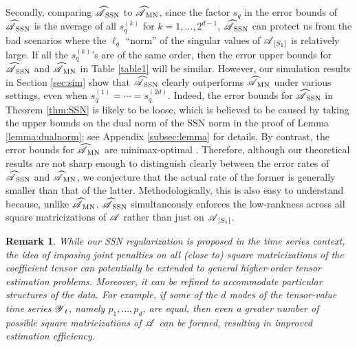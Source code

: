 \documentclass[12pt]{article}
\newtheorem{remark}{Remark}
\newcommand{\cm}[1]{\mbox{\boldmath$\mathscr{#1}$}}
\begin{document}
Secondly, comparing $\cm{\widehat{A}}_{\textup{SSN}}$ to $\cm{\widehat{A}}_{\textup{MN}}$, since the factor $s_q$ in the error bounds of $\cm{\widehat{A}}_{\textup{SSN}}$ is the average of all $s_q^{(k)}$ for $k=1,\dots, 2^{d-1}$, $\cm{\widehat{A}}_{\textup{SSN}}$ can protect us from the bad scenarios where the $\ell_q$ ``norm'' of the singular values of $\cm{A}_{[S_1]}$ is relatively large.  If all the $s_q^{(k)}$'s are of the same order, then the error upper bounds for $\cm{\widehat{A}}_{\textup{SSN}}$ and $\cm{\widehat{A}}_{\textup{MN}}$ in Table \ref{table1} will be similar. However, our simulation results in Section \ref{sec:sim} show that $\cm{\widehat{A}}_{\textup{SSN}}$ clearly outperforms $\cm{\widehat{A}}_{\textup{MN}}$ under various settings, even when $s_q^{(1)}=\cdots=s_q^{(2d)}$.
Indeed, the  error bounds for $\cm{\widehat{A}}_{\textup{SSN}}$ in Theorem \ref{thm:SSN} is likely to be loose, which is believed to be caused by taking the upper bounds on the dual norm of the SSN norm in the proof of Lemma \ref{lemma:dualnorm}; see Appendix \ref{subsec:lemma} for details. By contrast, the error bounds for $\cm{\widehat{A}}_{\textup{MN}}$ are minimax-optimal \citep{Han_Xu_Liu2015}.
Therefore, although our theoretical results are not sharp enough to  distinguish clearly between the error rates of $\cm{\widehat{A}}_{\textup{SSN}}$  and $\cm{\widehat{A}}_{\textup{MN}}$,  we conjecture that the actual rate of the former is generally smaller than that of the latter. Methodologically, this is also easy to understand because, unlike $\cm{\widehat{A}}_{\textup{MN}}$, $\cm{\widehat{A}}_{\textup{SSN}}$ simultaneously enforces the low-rankness across all square matricizations of $\cm{A}$ rather than just on  $\cm{A}_{[S_1]}$.

\begin{remark}
While our SSN regularization is proposed in the time series context, the idea of imposing joint penalties on all (close to) square matricizations of the coefficient tensor can potentially be extended to general higher-order tensor estimation problems.  Moreover, it can be refined to accommodate particular structures of the data. For example,	
if some of the $d$ modes of the tensor-value time series $\cm{Y}_t$, namely $p_1,\dots, p_d$, are equal, then even a greater number of possible square matricizations of $\cm{A}$ can be formed, resulting in improved estimation efficiency. 
\end{remark}
\end{document}
